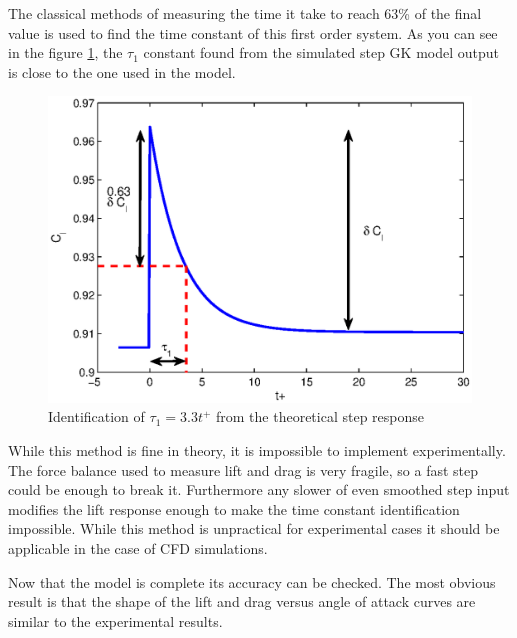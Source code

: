 \par The classical methods of measuring the time it take to reach 63\% of the final value is used to find the time constant of this first order system.
As you can see in the figure \ref{fig:tau_1_identification}, the $\tau_1$ constant found from the simulated step GK model output is close to the one used in the model.

\begin{figure}[h]
  \centering
  \includegraphics{./Figures/tau_1_Cl_vs_tplus_step_12to13.eps}
  \caption{Identification of $\tau_1=3.3t^+$ from the theoretical step response}
  \label{fig:tau_1_identification}
\end{figure}	

\FloatBarrier

\par While this method is fine in theory, it is impossible to implement experimentally.
The force balance used to measure lift and drag is very fragile, so a fast step could be enough to break it.
Furthermore any slower of even smoothed step input modifies the lift response enough to make the time constant identification impossible.
While this method is unpractical for experimental cases it should be applicable in the case of CFD simulations.

Now that the model is complete its accuracy can be checked.
The most obvious result is that the shape of the lift and drag versus angle of attack curves are similar to the experimental results.

